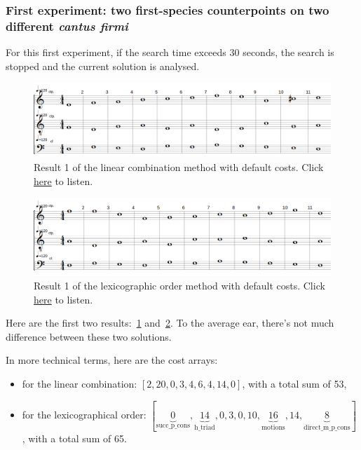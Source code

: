 \subsubsection{First experiment: two first-species counterpoints on two different \textit{cantus firmi}}
For this first experiment, if the search time exceeds 30 seconds, the search is stopped and the current solution is analysed.
\begin{figure}[h]
    \centering
    \includegraphics[width=1\textwidth]{Images/Experiments/linear-combination-1sp.png}
    \caption{Result 1 of the linear combination method with default costs. Click \href{https://youtu.be/w7EQ3b8JHnM}{here} to listen.}
    \label{fig:combili-1sp}
\end{figure}

\begin{figure}[h]
    \centering
    \includegraphics[width=1\textwidth]{Images/Experiments/basic-lexico-1sp.png}
    \caption{Result 1 of the lexicographic order method with default costs. Click \href{https://youtu.be/ryrpi5QNmf0}{here} to listen.}
    \label{fig:lexico-1sp}
\end{figure}

Here are the first two results:~\ref{fig:combili-1sp} and~\ref{fig:lexico-1sp}. To the average ear, there's not much difference between these two solutions.

In more technical terms, here are the cost arrays: 
\begin{itemize}
    \item for the linear combination: $[2, 20, 0, 3, 4, 6, 4, 14, 0]$, with a total sum of 53,
    \item for the lexicographical order: $[\underset{\text{succ\_p\_cons}}{\underbrace{0}}, \underset{\text{h\_triad}}{\underbrace{14}}, 0, 3, 0, 10, \underset{\text{motions}}{\underbrace{16}}, 14, \underset{\text{direct\_m\_p\_cons}}{\underbrace{8}}]$, with a total sum of 65.
\end{itemize}

